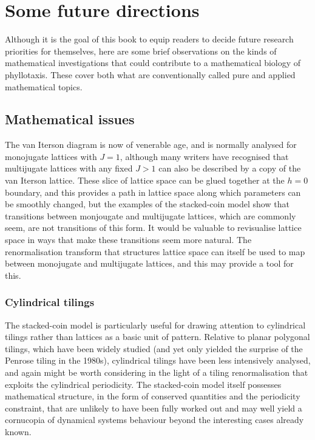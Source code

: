 
\chapter{Some future directions}

Although it is the goal of this book to equip readers to decide future research priorities for themselves, here are some brief observations on the kinds of mathematical investigations that could contribute to a mathematical biology of phyllotaxis. These cover both what are conventionally called pure and applied mathematical topics. 

\section{Mathematical issues}
The van Iterson diagram is now of venerable age, and is normally analysed for monojugate lattices with $J=1$, although many writers have recognised that multijugate lattices with any fixed $J>1$ can also be described by a copy of the van Iterson lattice. These slice of lattice space can be glued together at the $h=0$ boundary, and this provides a path in lattice space along which parameters can be smoothly changed, but the examples of the stacked-coin model show that transitions between monjougate and multijugate lattices, which are commonly seem, are not transitions of this form. It would be valuable to revisualise lattice space in ways that make these transitions seem more natural. 
The renormalisation transform that structures lattice space can itself be used to map between monojugate and multijugate lattices, and this may provide a tool for this.

\subsection{Cylindrical tilings}
The stacked-coin model is particularly useful for drawing attention to cylindrical tilings rather than lattices as a basic unit of pattern. Relative to planar polygonal tilings, which have been widely studied (and yet only yielded the surprise of the Penrose tiling in the 1980s), cylindrical tilings have been less intensively analysed, and again might be worth considering in the light of a tiling renormalisation that exploits the cylindrical periodicity. The stacked-coin model itself possesses mathematical structure, in the form of conserved quantities and the periodicity constraint, that are unlikely to have been fully worked out and may well yield a cornucopia of dynamical systems behaviour beyond the interesting cases already known.
 
